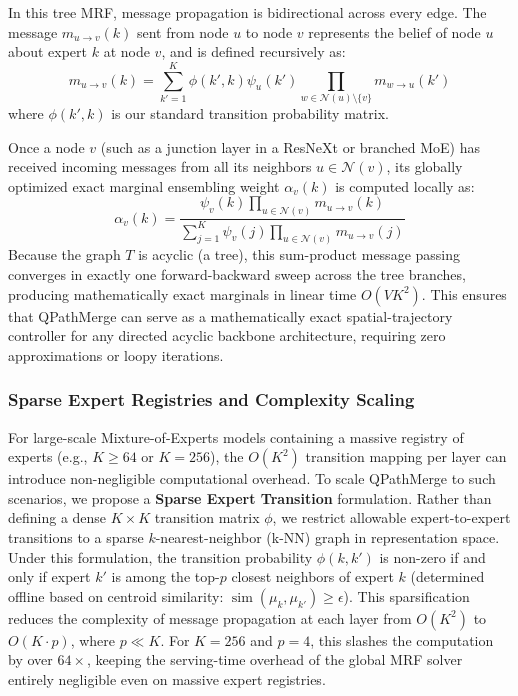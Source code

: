 In this tree MRF, message propagation is bidirectional across every edge. The message $m_{u \to v}(k)$ sent from node $u$ to node $v$ represents the belief of node $u$ about expert $k$ at node $v$, and is defined recursively as:
\begin{equation}
    m_{u \to v}(k) = \sum_{k' = 1}^K \phi(k', k) \psi_u(k') \prod_{w \in \mathcal{N}(u) \setminus \{v\}} m_{w \to u}(k')
\end{equation}
where $\phi(k', k)$ is our standard transition probability matrix.

Once a node $v$ (such as a junction layer in a ResNeXt or branched MoE) has received incoming messages from all its neighbors $u \in \mathcal{N}(v)$, its globally optimized exact marginal ensembling weight $\alpha_v(k)$ is computed locally as:
\begin{equation}
    \alpha_v(k) = \frac{\psi_v(k) \prod_{u \in \mathcal{N}(v)} m_{u \to v}(k)}{\sum_{j=1}^K \psi_v(j) \prod_{u \in \mathcal{N}(v)} m_{u \to v}(j)}
\end{equation}
Because the graph $T$ is acyclic (a tree), this sum-product message passing converges in exactly one forward-backward sweep across the tree branches, producing mathematically exact marginals in linear time $O(V K^2)$. This ensures that QPathMerge can serve as a mathematically exact spatial-trajectory controller for any directed acyclic backbone architecture, requiring zero approximations or loopy iterations.

\subsubsection{Sparse Expert Registries and Complexity Scaling}
For large-scale Mixture-of-Experts models containing a massive registry of experts (e.g., $K \ge 64$ or $K=256$), the $O(K^2)$ transition mapping per layer can introduce non-negligible computational overhead. 
To scale QPathMerge to such scenarios, we propose a \textbf{Sparse Expert Transition} formulation. 
Rather than defining a dense $K \times K$ transition matrix $\phi$, we restrict allowable expert-to-expert transitions to a sparse $k$-nearest-neighbor (k-NN) graph in representation space. 
Under this formulation, the transition probability $\phi(k, k')$ is non-zero if and only if expert $k'$ is among the top-$p$ closest neighbors of expert $k$ (determined offline based on centroid similarity: $\operatorname{sim}(\mu_k, \mu_{k'}) \ge \epsilon$). 
This sparsification reduces the complexity of message propagation at each layer from $O(K^2)$ to $O(K \cdot p)$, where $p \ll K$. For $K=256$ and $p=4$, this slashes the computation by over $64\times$, keeping the serving-time overhead of the global MRF solver entirely negligible even on massive expert registries.

